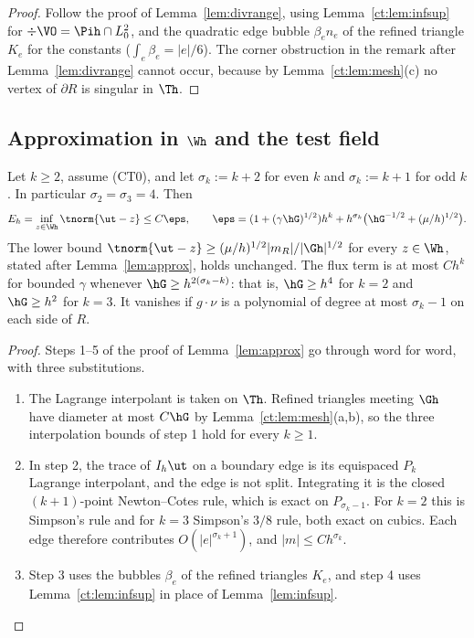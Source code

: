 \begin{proof}
Follow the proof of Lemma~\ref{lem:divrange}, using Lemma~\ref{ct:lem:infsup} for $\div\VO=\Pih\cap L^2_0$, and the quadratic edge bubble $\beta_en_e$ of the refined triangle $K_e$ for the constants ($\int_e\beta_e=|e|/6$). The corner obstruction in the remark after Lemma~\ref{lem:divrange} cannot occur, because by Lemma~\ref{ct:lem:mesh}(c) no vertex of $\partial R$ is singular in $\Th$.
\end{proof}

\subsection{Approximation in \texorpdfstring{$\Wh$}{W\_h} and the test field}

\begin{lemma}[Approximation in $\Wh$, $k\ge2$]\label{ct:lem:approx}
Let $k\ge2$, assume (CT0), and let $\sigma_k:=k+2$ for even $k$ and $\sigma_k:=k+1$ for odd $k$. In particular $\sigma_2=\sigma_3=4$. Then
\[
E_h=\inf_{z\in\Wh}\tnorm{\ut-z}\le C\eps,\qquad\eps=(1+(\gamma\hG)^{1/2})h^k+h^{\sigma_k}\bigl(\hG^{-1/2}+(\mu/h)^{1/2}\bigr).
\]
The lower bound $\tnorm{\ut-z}\ge(\mu/h)^{1/2}|m_R|/|\Gh|^{1/2}$ for every $z\in\Wh$, stated after Lemma~\ref{lem:approx}, holds unchanged. The flux term is at most $Ch^k$ for bounded $\gamma$ whenever $\hG\ge h^{2(\sigma_k-k)}$: that is, $\hG\ge h^4$ for $k=2$ and $\hG\ge h^2$ for $k=3$. It vanishes if $g\cdot\nu$ is a polynomial of degree at most $\sigma_k-1$ on each side of $R$.
\end{lemma}

\begin{proof}
Steps 1--5 of the proof of Lemma~\ref{lem:approx} go through word for word, with three substitutions.
\begin{enumerate}
\item The Lagrange interpolant is taken on $\Th$. Refined triangles meeting $\Gh$ have diameter at most $C\hG$ by Lemma~\ref{ct:lem:mesh}(a,b), so the three interpolation bounds of step 1 hold for every $k\ge1$.
\item In step 2, the trace of $I_h\ut$ on a boundary edge is its equispaced $P_k$ Lagrange interpolant, and the edge is not split. Integrating it is the closed $(k+1)$-point Newton--Cotes rule, which is exact on $P_{\sigma_k-1}$. For $k=2$ this is Simpson's rule and for $k=3$ Simpson's $3/8$ rule, both exact on cubics. Each edge therefore contributes $O(|e|^{\sigma_k+1})$, and $|m|\le Ch^{\sigma_k}$.
\item Step 3 uses the bubbles $\beta_e$ of the refined triangles $K_e$, and step 4 uses Lemma~\ref{ct:lem:infsup} in place of Lemma~\ref{lem:infsup}.\qedhere
\end{enumerate}
\end{proof}

